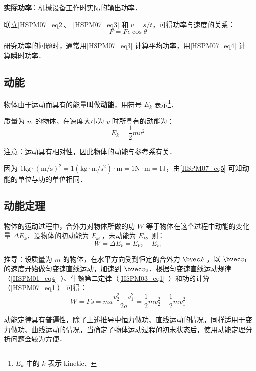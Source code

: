 \textbf{实际功率}：机械设备工作时实际的输出功率．

联立\autoref{HSPM07_eq2}、 \autoref{HSPM07_eq3} 和 $v=s/t$，可得功率与速度的关系：
\begin{equation}\label{HSPM07_eq4}
P=Fv\cos \theta
\end{equation}

研究功率的问题时，通常用\autoref{HSPM07_eq3} 计算平均功率，用\autoref{HSPM07_eq4} 计算瞬时功率．

\subsection{动能}

物体由于运动而具有的能量叫做\textbf{动能}，用符号 $E_k$ 表示\footnote{$E_k$ 中的 $k$ 表示 kinetic．}．

质量为 $m$ 的物体，在速度大小为 $v$ 时所具有的动能为：
\begin{equation}\label{HSPM07_eq5}
E_k=\frac12mv^2
\end{equation}

注意：运动具有相对性，因此物体的动能与参考系有关．

因为 $\mathrm{1kg\cdot (m/s)^2=1(kg\cdot m/s^2)\cdot m=1N\cdot m=1J}$，由\autoref{HSPM07_eq5} 可知动能的单位与功的单位相同．

\subsection{动能定理}

物体的运动过程中，合外力对物体所做的功 $W$ 等于物体在这个过程中动能的变化量 $\Delta E_k$．设物体的初动能为 $E_{k1}$，末动能为 $E_{k2}$ 则：
\begin{equation}\label{HSPM07_eq6}
W=\Delta E_k =E_{k2}-E_{k1}
\end{equation}

推导：设质量为 $m$ 的物体，在水平方向受到恒定的合外力 $\bvec F$，以 $\bvec v_1$ 的速度开始做匀变速直线运动，加速到 $\bvec v_2$．根据匀变速直线运动规律（\autoref{HSPM01_eq4}~）、牛顿第二定律（\autoref{HSPM03_eq1}~）和功的计算（\autoref{HSPM07_eq1}） 可得：
\begin{equation}
W=Fs=ma\frac{v_2^2-v_1^2}{2a}=\frac12mv_2^2-\frac12mv_1^2
\end{equation}

动能定律具有普遍性，除了上述推导中恒力做功、直线运动的情况，同样适用于变力做功、曲线运动的情况，当确定了物体运动过程的初末状态后，使用动能定理分析问题会较为方便．

